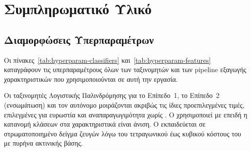 

\chapter{Συμπληρωματικό Υλικό}
\label{ch:a}


\section{Διαμορφώσεις Υπερπαραμέτρων}
\label{sec:hyperparams}

Οι πίνακες~\ref{tab:hyperparam-classifiers} και~\ref{tab:hyperparam-features} καταγράφουν
τις υπερπαραμέτρους όλων των ταξινομητών και των pipeline εξαγωγής χαρακτηριστικών που
χρησιμοποιούνται σε αυτή την εργασία.

Οι ταξινομητές Λογιστικής Παλινδρόμησης για το Επίπεδο~1, το Επίπεδο~2 (ενσωμάτωση) και
τον αυτόνομο \texttt{} μοιράζονται ακριβώς τις ίδιες προεπιλεγμένες τιμές,
επιλεγμένες για ευρωστία και αναπαραγωγιμότητα χωρίς .
Ο \texttt{} χρησιμοποιεί  με \texttt{}
επειδή η κατανομή κλάσεων στα χαρακτηριστικά  είναι άνιση.
Ο \texttt{} εκπαιδεύεται σε στρωματοποιημένο δείγμα \SvmSampleSize{} ζευγών
λόγω του τετραγωνικού έως κυβικού κόστους του  με πυρήνα ακτινικής βάσης.

